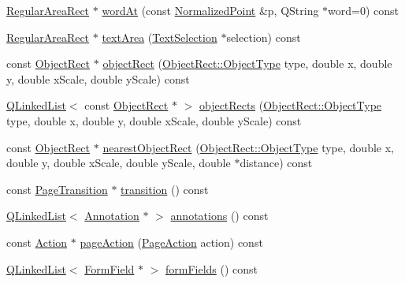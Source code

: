 \begin{DoxyCompactItemize}
\item 
\hyperlink{classOkular_1_1RegularAreaRect}{Regular\+Area\+Rect} $\ast$ \hyperlink{classOkular_1_1Page_a24f42662e569d3b3a2011e8a5cc99e3e}{word\+At} (const \hyperlink{classOkular_1_1NormalizedPoint}{Normalized\+Point} \&p, Q\+String $\ast$word=0) const 
\item 
\hyperlink{classOkular_1_1RegularAreaRect}{Regular\+Area\+Rect} $\ast$ \hyperlink{classOkular_1_1Page_a117cec50481eeea1e1ca9881eaeceb9e}{text\+Area} (\hyperlink{classOkular_1_1TextSelection}{Text\+Selection} $\ast$selection) const 
\item 
const \hyperlink{classOkular_1_1ObjectRect}{Object\+Rect} $\ast$ \hyperlink{classOkular_1_1Page_ab6a680a31a5d67861013d706d028dde7}{object\+Rect} (\hyperlink{classOkular_1_1ObjectRect_a2f77f7653306bae90bfb68277aaafe16}{Object\+Rect\+::\+Object\+Type} type, double x, double y, double x\+Scale, double y\+Scale) const 
\item 
\hyperlink{classQLinkedList}{Q\+Linked\+List}$<$ const \hyperlink{classOkular_1_1ObjectRect}{Object\+Rect} $\ast$ $>$ \hyperlink{classOkular_1_1Page_a501451ef85226267764bda58163a328a}{object\+Rects} (\hyperlink{classOkular_1_1ObjectRect_a2f77f7653306bae90bfb68277aaafe16}{Object\+Rect\+::\+Object\+Type} type, double x, double y, double x\+Scale, double y\+Scale) const 
\item 
const \hyperlink{classOkular_1_1ObjectRect}{Object\+Rect} $\ast$ \hyperlink{classOkular_1_1Page_abd20ee862d49cc60be0c3daabfb94cf4}{nearest\+Object\+Rect} (\hyperlink{classOkular_1_1ObjectRect_a2f77f7653306bae90bfb68277aaafe16}{Object\+Rect\+::\+Object\+Type} type, double x, double y, double x\+Scale, double y\+Scale, double $\ast$distance) const 
\item 
const \hyperlink{classOkular_1_1PageTransition}{Page\+Transition} $\ast$ \hyperlink{classOkular_1_1Page_a9ca239aa5e2957a354075636086723cb}{transition} () const 
\item 
\hyperlink{classQLinkedList}{Q\+Linked\+List}$<$ \hyperlink{classOkular_1_1Annotation}{Annotation} $\ast$ $>$ \hyperlink{classOkular_1_1Page_ad82e0f26d5435b5ccfa3d23c359ac23c}{annotations} () const 
\item 
const \hyperlink{classOkular_1_1Action}{Action} $\ast$ \hyperlink{classOkular_1_1Page_a960c4dd29f12aaabaa66880c19540203}{page\+Action} (\hyperlink{classOkular_1_1Page_a6a8e241cdb604d5c90d5f80b169788f7}{Page\+Action} action) const 
\item 
\hyperlink{classQLinkedList}{Q\+Linked\+List}$<$ \hyperlink{classOkular_1_1FormField}{Form\+Field} $\ast$ $>$ \hyperlink{classOkular_1_1Page_a2509e1e2a7f0fe8189970fd9f7d5fe24}{form\+Fields} () const 

\end{DoxyCompactItemize}
